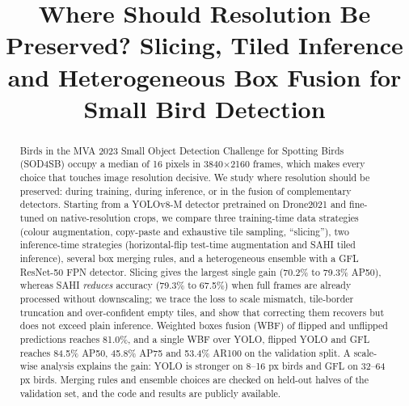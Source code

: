 \documentclass[conference]{IEEEtran}
\begin{document}
\title{Where Should Resolution Be Preserved? Slicing, Tiled Inference and Heterogeneous Box Fusion for Small Bird Detection}

\author{
\and
{}
\and
{}
\and
{}
}

\maketitle

\begin{abstract}
Birds in the MVA 2023 Small Object Detection Challenge for Spotting Birds (SOD4SB) occupy a median of 16 pixels
in 3840$\times$2160 frames, which makes every choice that touches image resolution decisive. We study where
resolution should be preserved: during training, during inference, or in the fusion of complementary detectors.
Starting from a YOLOv8-M detector pretrained on Drone2021 and fine-tuned on native-resolution crops, we compare
three training-time data strategies (colour augmentation, copy-paste and exhaustive tile sampling, ``slicing''),
two inference-time strategies (horizontal-flip test-time augmentation and SAHI tiled inference), several box
merging rules, and a heterogeneous ensemble with a GFL ResNet-50 FPN detector. Slicing gives the largest single
gain (70.2\% to 79.3\% AP50), whereas SAHI \emph{reduces} accuracy (79.3\% to 67.5\%) when full frames are already
processed without downscaling; we trace the loss to scale mismatch, tile-border truncation and over-confident
empty tiles, and show that correcting them recovers but does not exceed plain inference. Weighted boxes fusion
(WBF) of flipped and unflipped predictions reaches 81.0\%, and a single WBF over YOLO, flipped YOLO and GFL
reaches 84.5\% AP50, 45.8\% AP75 and 53.4\% AR100 on the validation split. A scale-wise analysis explains the gain:
YOLO is stronger on 8--16 px birds and GFL on 32--64 px birds. Merging rules and ensemble choices are checked on
held-out halves of the validation set, and the code and results are publicly available.
\end{abstract}
\end{document}
